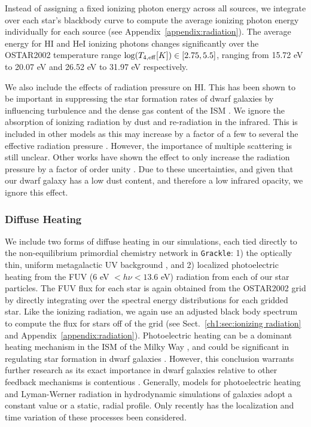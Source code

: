 Instead of assigning a fixed ionizing photon energy across all sources, we integrate over each star's blackbody curve to compute the average ionizing photon energy individually for each source (see Appendix~\ref{appendix:radiation}). The average energy for HI and HeI ionizing photons changes significantly over the OSTAR2002 temperature range $\log(T_{4,\rm{eff}} [K]) \in \left[2.75,5.5\right]$, ranging from 15.72 eV to 20.07 eV and 26.52 eV to 31.97 eV respectively.

We also include the effects of radiation pressure on HI. This has been shown to be important in suppressing the star formation rates of dwarf galaxies by influencing turbulence and the dense gas content of the ISM \citep{WiseAbel2012,Ceverino2014}. We ignore the absorption of ionizing radiation by dust and re-radiation in the infrared. This is included in other models \citep[e.g.][]{Rosdahl2015,FIRE,FIRE2} as this may increase by a factor of a few to several the effective radiation pressure \citep{ZhangDavis2017}. However, the importance of multiple scattering is still unclear. Other works have shown the effect to only increase the radiation pressure by a factor of order unity \citep{Krumholz2012,Krumholz2013a,Krumholz2018,Reissl2018,Wibking2018}. Due to these uncertainties, and given that our dwarf galaxy has a low dust content, and therefore a low infrared opacity, we ignore this effect.

\subsubsection{Diffuse  Heating}
\label{ch1:sec:diffusive heating}
We include two forms of diffuse heating in our simulations, each tied directly to the non-equilibrium primordial chemistry network in \texttt{Grackle}: 1) the optically thin, uniform metagalactic UV background \citep{HM2012}, and 2) localized photoelectric heating from the FUV (6 eV $<h\nu< 13.6$ eV) radiation from each of our star particles. The FUV flux for each star is again obtained from the OSTAR2002 grid by directly integrating over the spectral energy distributions for each gridded star. Like the ionizing radiation, we again use an adjusted black body spectrum to compute the flux for stars off of the grid (see Sect.~\ref{ch1:sec:ionizing radiation} and Appendix~\ref{appendix:radiation}). Photoelectric heating can be a dominant heating mechanism in the ISM of the Milky Way \citep{Parravano2003}, and could be significant in regulating star formation in dwarf galaxies \citep{Forbes2016}. However, this conclusion warrants further research as its exact importance in dwarf galaxies relative to other feedback mechanisms is contentious \citep{Hu2016,Hu2017}. Generally, models for photoelectric heating and Lyman-Werner radiation in hydrodynamic simulations of galaxies adopt a constant value or a static, radial profile. Only recently has the localization and time variation of these processes been considered.

